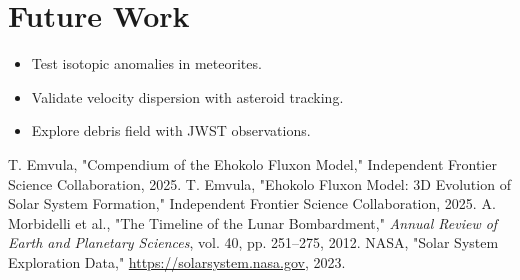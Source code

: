 \documentclass[11pt]{article}
\begin{document}
\section{Future Work}
\begin{itemize}
    \item Test isotopic anomalies in meteorites.
    \item Validate velocity dispersion with asteroid tracking.
    \item Explore debris field with JWST observations.
\end{itemize}

\begin{thebibliography}{4}
\raggedright
{} T. Emvula, "Compendium of the Ehokolo Fluxon Model," Independent Frontier Science Collaboration, 2025.
 T. Emvula, "Ehokolo Fluxon Model: 3D Evolution of Solar System Formation," Independent Frontier Science Collaboration, 2025.
 A. Morbidelli et al., "The Timeline of the Lunar Bombardment," \textit{Annual Review of Earth and Planetary Sciences}, vol. 40, pp. 251--275, 2012.
 NASA, "Solar System Exploration Data," \url{https://solarsystem.nasa.gov}, 2023.
\end{thebibliography}
\end{document}
